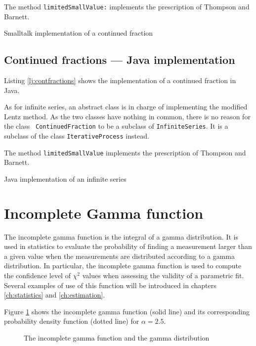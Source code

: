 \documentclass[twoside]{book}
\begin{document}
The method {\tt limitedSmallValue:} implements the prescription of
Thompson and Barnett.
\begin{listing} Smalltalk implementation of a continued fraction \label{ls:contfractions}

\end{listing}

\subsection{Continued fractions --- Java  implementation}
\label{sec:jcontfractions} Listing \ref{lj:contfractions} shows the implementation
of a continued fraction in Java.

As for infinite series, an abstract class is in charge of
implementing the modified Lentz method. As the two classes have
nothing in common, there is no reason for the class {\tt
ContinuedFraction} to be a subclass of {\tt InfiniteSeries}. It is
a subclass of the class {\tt IterativeProcess} instead.

The method {\tt limitedSmallValue} implements the prescription of
Thompson and Barnett.
\begin{listing} Java implementation of an infinite series \label{lj:contfractions}

\end{listing}

\section{Incomplete Gamma function}
\label{sec:incGamma} The incomplete gamma function is the integral
of a gamma distribution. It is used in statistics to evaluate the
probability of finding a measurement larger than a given value
when the measurements are distributed according to a gamma
distribution. In particular, the incomplete gamma function is used
to compute the confidence level of $\chi^2$ values when assessing
the validity of a parametric fit. Several examples of use of this
function will be introduced in chapters \ref{ch:statistics} and
\ref{ch:estimation}.

Figure \ref{fig:incGamma} shows the incomplete gamma function
(solid line) and its corresponding probability density function
(dotted line) for $\alpha=2.5$.
\begin{figure}
\center{} \caption{The incomplete gamma function and the gamma
distribution}\label{fig:incGamma}
\end{figure}
\end{document}
